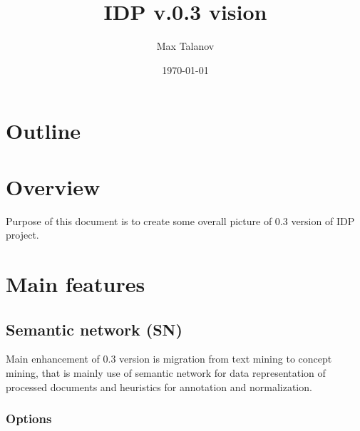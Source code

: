 \documentclass[12pt]{article}
\title{IDP v.0.3 vision}
\author{Max Talanov}
\date{\today}
\begin{document}
\maketitle

\section{Outline}
\tableofcontents

\section{Overview}
Purpose of this document is to create some overall picture of 0.3 version of IDP project.

\section{Main features}

\subsection{Semantic network (SN)}
Main enhancement of 0.3 version is migration from text mining to concept mining, that is mainly use of semantic network for data representation of processed documents and heuristics for annotation and normalization.

\subsubsection{Options}
\end{document}
